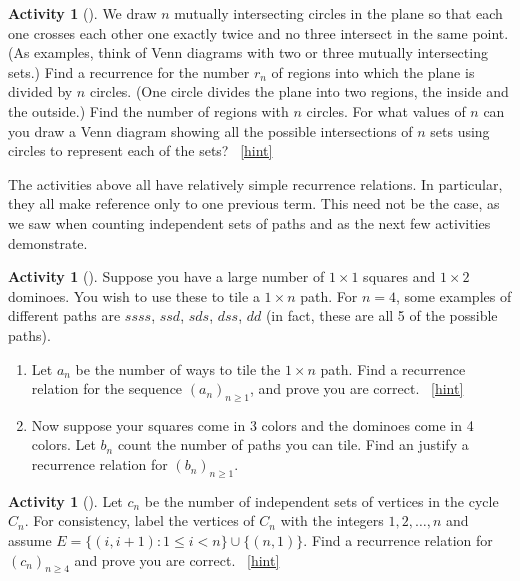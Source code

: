 \documentclass[10pt,]{book}
\theoremstyle{plain}
\theoremstyle{definition}
\theoremstyle{definition}
\theoremstyle{definition}
\newtheorem{activity}[project]{Activity}
\numberwithin{equation}{chapter}
\def\st{:}
\newcommand{\lt}{<}
\begin{document}
\begin{activity}[]\label{circlesinplane}
\hypertarget{p-904}{}%
We draw \(n\) mutually intersecting circles in the plane so that each one crosses each other one exactly twice and no three intersect in the same point. (As examples, think of Venn diagrams with two or three mutually intersecting sets.) Find a recurrence for the number \(r_n\) of regions into which the plane is divided by \(n\) circles. (One circle divides the plane into two regions, the inside and the outside.) Find the number of regions with \(n\) circles. For what values of \(n\) can you draw a Venn diagram showing all the possible intersections of \(n\) sets using circles to represent each of the sets?%
~\hfill{\tiny\hyperlink{a-138}{[hint]}\hypertarget{q-138}{}}\end{activity}
\hypertarget{p-909}{}%
The activities above all have relatively simple recurrence relations.  In particular, they all make reference only to one previous term.  This need not be the case, as we saw when counting independent sets of paths and as the next few activities demonstrate.%
\begin{activity}[]\label{act-dominoes}
\hypertarget{p-910}{}%
Suppose you have a large number of \(1\times 1\) squares and \(1 \times 2\) dominoes.  You wish to use these to tile a \(1 \times n\) path.  For \(n = 4\), some examples of different paths are \(ssss\), \(ssd\), \(sds\), \(dss\), \(dd\) (in fact, these are all 5 of the possible paths).%
\begin{enumerate}[font=\bfseries,label=(\alph*),ref=\alph*]
\item\label{task-173} \hypertarget{p-911}{}%
Let \(a_n\) be the number of ways to tile the \(1 \times n\) path.  Find a recurrence relation for the sequence \((a_n)_{n \ge 1}\), and prove you are correct.%
~\hfill{\tiny\hyperlink{a-139.a}{[hint]}\hypertarget{q-139.a}{}}\item\label{task-174} \hypertarget{p-913}{}%
Now suppose your squares come in 3 colors and the dominoes come in 4 colors.  Let \(b_n\) count the number of paths you can tile.  Find an justify a recurrence relation for \((b_n)_{n \ge 1}\).%
\end{enumerate}
\end{activity}
\begin{activity}[]\label{activity-133}
\hypertarget{p-914}{}%
Let \(c_n\) be the number of independent sets of vertices in the cycle \(C_n\).  For consistency, label the vertices of \(C_n\) with the integers \(1, 2, \ldots, n\) and assume \(E = \{(i, i+1) \st 1 \le i \lt n\} \cup \{(n, 1)\}\). Find a recurrence relation for \((c_n)_{n\ge 4}\) and prove you are correct.%
~\hfill{\tiny\hyperlink{a-140}{[hint]}\hypertarget{q-140}{}}\end{activity}
\end{document}
